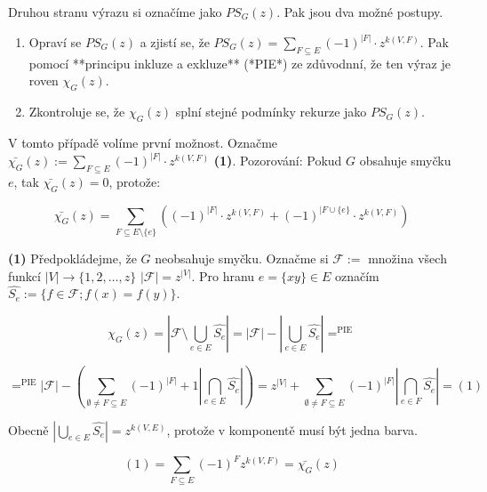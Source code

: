 \begin{dukaz}
	Druhou stranu výrazu si označíme jako $PS_{G}(z)$. Pak jsou dva možné postupy.
	
	\begin{enumerate}
		\item Opraví se $PS_{G}(z)$ a zjistí se, že $PS_{G}(z) = \sum_{F \subseteq E}(-1)^{|F|} \cdot z^{k(V,F)}$. Pak pomocí **principu inkluze a exkluze** (*PIE*) ze zdůvodnní, že ten výraz je roven $\chi_{G}(z)$.
		\item Zkontroluje se, že $\chi_{G}(z)$ splní stejné podmínky rekurze jako $PS_{G}(z)$.
	\end{enumerate}
	
	V tomto případě volíme první možnost. Označme $\bar{\chi_{G}}(z) := \sum_{F \subseteq E}(-1)^{|F|} \cdot z^{k(V,F)}$ \textbf{(1)}. Pozorování: Pokud $G$ obsahuje smyčku $e$, tak $\bar{\chi_{G}}(z) = 0$, protože:
	
	$$
	\bar{\chi_{G}}(z) = \sum_{F \subseteq E \setminus \{e\}}((-1)^{|F|} \cdot z^{k(V,F)} + (-1)^{|F \cup \{e\}} \cdot z^{k(V,F)})
	$$
	
	\textbf{(1)} Předpokládejme, že $G$ neobsahuje smyčku. Označme si $\mathcal{F}:=$ množina všech funkcí $|V| \to \{1,2,\dots, z\}$ $|\mathcal{F}|= z^{|V|}$. Pro hranu $e = \{xy\} \in E$ označím $\hat{S_{e}}:= \{f \in \mathcal{F}; f(x) = f(y)\}$.
	
	$$
	\chi_{G}(z) = |\mathcal{F} \setminus \bigcup_{e \in E}\hat{S_{e}}| = |\mathcal{F}| - |\bigcup_{e \in E}\hat{S_{e}}| =^{\text{PIE}}
	$$
	
	$$
	=^{\text{PIE}} |\mathcal{F}| - (\sum_{\emptyset \neq F \subseteq E} (-1)^{|F|}+1 |\bigcap_{e \in E} \hat{S_{e}}|) = z^{|V|} + \sum_{\emptyset \neq F \subseteq E}(-1)^{|F|}|\bigcap_{e \in F}\hat{S_{e}}| =(1)
	$$
	
	Obecně $|\bigcup_{e \in E} \hat{S_{e}}| = z^{k(V,E)}$, protože v komponentě musí být jedna barva.
	
	$$
	(1) = \sum_{F \subseteq E}(-1)^{F} z^{k(V,F)} = \bar{\chi_{G}}(z)
	$$
\end{dukaz}